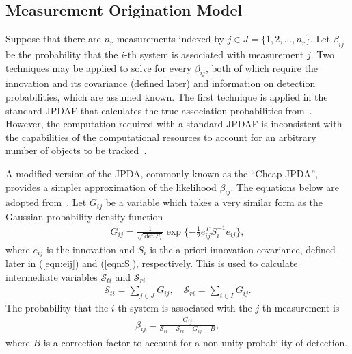 \documentclass[letterpaper, 10pt, conference]{ieeeconf}
\newcommand{\refeqn}[1]{(\ref{eqn:#1})}
\begin{document}

\subsection{Measurement Origination Model}
\label{DAP}


Suppose that there are $n_r$ measurements indexed by $j\in J=\{1,2,...,n_r\}$.
Let $\beta_{ij}$ be the probability that the $i$-th system is associated with measurement $j$.
Two techniques may be applied to solve for every $\beta_{ij}$, both of which require the innovation and its covariance (defined later) and information on detection probabilities, which are assumed known.
The first technique is applied in the standard JPDAF that calculates the true association probabilities from~\cite[Eq. 9.(45-46)]{TrackDataAssoc}.
However, the computation required with a standard JPDAF is inconsistent with the capabilities of the computational resources to account for an arbitrary number of objects to be tracked~\cite{Bar1990}.

A modified version of the JPDA, commonly known as the ``Cheap JPDA'', provides a simpler approximation of the likelihood $\beta_{ij}$.
The equations below are adopted from~\cite[Eq. 1.(1-2)]{Bar1990}.
Let $G_{ij}$ be a variable which takes a very similar form as the Gaussian probability density function
\begin{align}
G_{ij}=\frac1{\sqrt{\det{S_{i}}}}\exp{\{-\frac12e_{ij}^TS_{i}^{-1}e_{ij}\}},
\end{align}
where $e_{ij}$ is the innovation and $S_{i}$ is the a priori innovation covariance, defined later in \refeqn{eij} and \refeqn{S}, respectively.
This is used to calculate intermediate variables $\mathcal{S}_{ti}$ and $\mathcal{S}_{ri}$
\begin{align}
\mathcal{S}_{ti}=\sum\limits_{j\in J}G_{ij}, 
\quad 
\mathcal{S}_{ri}=\sum\limits_{i\in I}G_{ij}.
\end{align}
The probability that the $i$-th system is associated with the $j$-th measurement is
\begin{align}
\beta_{ij}=\frac{G_{ij}}{\mathcal{S}_{ti}+\mathcal{S}_{ri}-G_{ij}+B}, 
\end{align}
where $B$ is a correction factor to account for a non-unity probability of detection.
\end{document}
